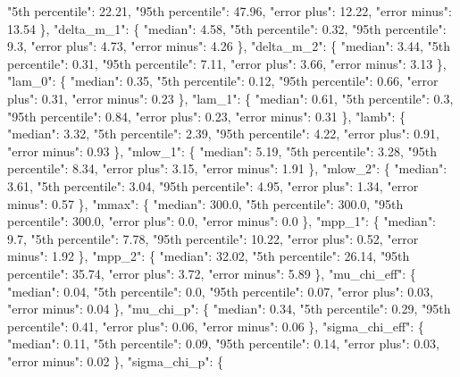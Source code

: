 {{        "5th percentile": 22.21, %
        "95th percentile": 47.96, %
        "error plus": 12.22, %
        "error minus": 13.54%
      \}, %
      "delta\_m\_1": \{%
        "median": 4.58, %
        "5th percentile": 0.32, %
        "95th percentile": 9.3, %
        "error plus": 4.73, %
        "error minus": 4.26%
      \}, %
      "delta\_m\_2": \{%
        "median": 3.44, %
        "5th percentile": 0.31, %
        "95th percentile": 7.11, %
        "error plus": 3.66, %
        "error minus": 3.13%
      \}, %
      "lam\_0": \{%
        "median": 0.35, %
        "5th percentile": 0.12, %
        "95th percentile": 0.66, %
        "error plus": 0.31, %
        "error minus": 0.23%
      \}, %
      "lam\_1": \{%
        "median": 0.61, %
        "5th percentile": 0.3, %
        "95th percentile": 0.84, %
        "error plus": 0.23, %
        "error minus": 0.31%
      \}, %
      "lamb": \{%
        "median": 3.32, %
        "5th percentile": 2.39, %
        "95th percentile": 4.22, %
        "error plus": 0.91, %
        "error minus": 0.93%
      \}, %
      "mlow\_1": \{%
        "median": 5.19, %
        "5th percentile": 3.28, %
        "95th percentile": 8.34, %
        "error plus": 3.15, %
        "error minus": 1.91%
      \}, %
      "mlow\_2": \{%
        "median": 3.61, %
        "5th percentile": 3.04, %
        "95th percentile": 4.95, %
        "error plus": 1.34, %
        "error minus": 0.57%
      \}, %
      "mmax": \{%
        "median": 300.0, %
        "5th percentile": 300.0, %
        "95th percentile": 300.0, %
        "error plus": 0.0, %
        "error minus": 0.0%
      \}, %
      "mpp\_1": \{%
        "median": 9.7, %
        "5th percentile": 7.78, %
        "95th percentile": 10.22, %
        "error plus": 0.52, %
        "error minus": 1.92%
      \}, %
      "mpp\_2": \{%
        "median": 32.02, %
        "5th percentile": 26.14, %
        "95th percentile": 35.74, %
        "error plus": 3.72, %
        "error minus": 5.89%
      \}, %
      "mu\_chi\_eff": \{%
        "median": 0.04, %
        "5th percentile": 0.0, %
        "95th percentile": 0.07, %
        "error plus": 0.03, %
        "error minus": 0.04%
      \}, %
      "mu\_chi\_p": \{%
        "median": 0.34, %
        "5th percentile": 0.29, %
        "95th percentile": 0.41, %
        "error plus": 0.06, %
        "error minus": 0.06%
      \}, %
      "sigma\_chi\_eff": \{%
        "median": 0.11, %
        "5th percentile": 0.09, %
        "95th percentile": 0.14, %
        "error plus": 0.03, %
        "error minus": 0.02%
      \}, %
      "sigma\_chi\_p": \{%
}}
